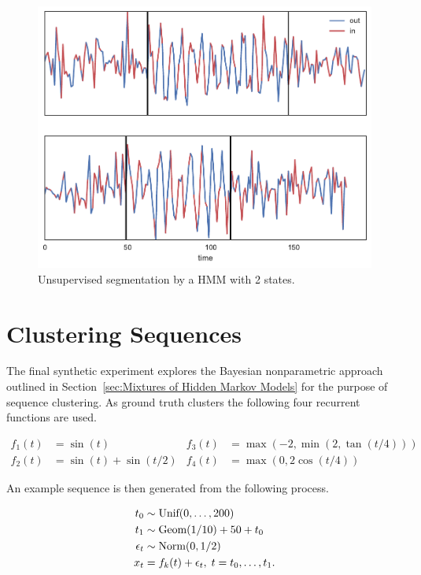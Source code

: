 \documentclass[12pt]{report}
\newcommand{\1}[0]{\mathbbm{1}}
\newcommand{\Unif}[0]{\textnormal{Unif}}
\newcommand{\Norm}[0]{\textnormal{Norm}}
\newcommand{\Geom}[0]{\textnormal{Geom}}
\begin{document}
\begin{figure}[H]
    \centering
    \includegraphics[width=1\textwidth]{img/artificial-segment-output-flat.pdf}
    \caption[Example segmentation of synthetic sequence without structure]{
        Unsupervised segmentation by a HMM with 2 states.
    }
    \label{fig:artificial-segmentation-flat}
\end{figure}

\section{Clustering Sequences}
\label{sec:Clustering Sequences}
The final synthetic experiment explores the Bayesian nonparametric approach outlined in
Section~\ref{sec:Mixtures of Hidden Markov Models} for the purpose of sequence clustering.
As ground truth clusters the following four recurrent functions are used.

\begin{align*}
    f_1(t) &= \sin(t) &
    f_3(t) &= \max(-2, \min(2, \tan(t/4))) \\
    f_2(t) &= \sin(t) + \sin(t/2) &
    f_4(t) &= \max(0, 2 \cos(t/ 4))
\end{align*}

An example sequence is then generated from the following process.

\begin{align*}
    t_0 & \sim \Unif({0, \ldots, 200}) \\
    t_1 & \sim \Geom(1/10) + 50 + t_0 \\
    \epsilon_t & \sim \Norm(0, 1/2) \\
    x_t &= f_k(t) + \epsilon_t,\; t=t_0,\ldots,t_1.
\end{align*}
\end{document}

